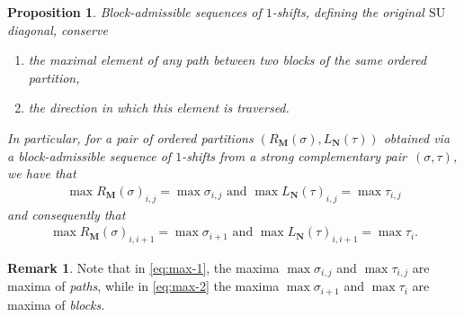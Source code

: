\documentclass{amsart}
\newtheorem{proposition}[theorem]{Proposition}
\theoremstyle{definition}
\newtheorem{remark}[theorem]{Remark}
\newcommand{\SU}{\mathrm{SU}}
\begin{document}
\begin{proposition} 
\label{prop:SU-preserves-max}
Block-admissible sequences of $1$-shifts, defining the original $\SU$ diagonal, conserve 
\begin{enumerate}
	\item the maximal element of any path between two blocks of the same ordered partition,
	\item the direction in which this element is traversed. 
\end{enumerate}
In particular, for a pair of ordered partitions $(R_{\mathbf{M}}(\sigma),L_{\mathbf{N}}(\tau))$ obtained via a block-admissible sequence of $1$-shifts from a strong complementary pair~$(\sigma,\tau)$, we have that
\begin{align}
	\label{eq:max-1}
	\max R_{\mathbf{M}}(\sigma)_{i,j} = \max \sigma_{i,j} \text{ and } \max L_{\mathbf{N}}(\tau)_{i,j} = \max \tau_{i,j}
\end{align}
and consequently that
\begin{align}
	\label{eq:max-2}
	\max R_{\mathbf{M}}(\sigma)_{i,i+1} = \max \sigma_{i+1} \text{ and } \max L_{\mathbf{N}}(\tau)_{i,i+1} = \max \tau_{i}  .
\end{align}
\end{proposition}

\begin{remark}
	Note that in \cref{eq:max-1}, the maxima $\max \sigma_{i,j}$ and $\max \tau_{i,j}$ are maxima of \emph{paths}, while in \cref{eq:max-2} the maxima $\max \sigma_{i+1}$ and $\max \tau_{i}$ are maxima of \emph{blocks}.
\end{remark}
\end{document}
